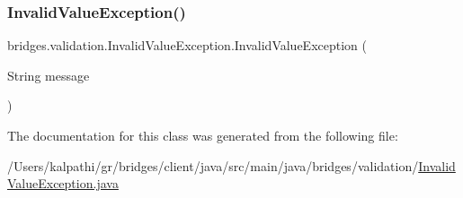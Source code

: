 \subsubsection{\texorpdfstring{Invalid\+Value\+Exception()}{InvalidValueException()}}
{\footnotesize\ttfamily bridges.\+validation.\+Invalid\+Value\+Exception.\+Invalid\+Value\+Exception (\begin{DoxyParamCaption}\item[{String}]{message }\end{DoxyParamCaption})}



The documentation for this class was generated from the following file\+:\begin{DoxyCompactItemize}
\item 
/\+Users/kalpathi/gr/bridges/client/java/src/main/java/bridges/validation/\mbox{\hyperlink{_invalid_value_exception_8java}{Invalid\+Value\+Exception.\+java}}\end{DoxyCompactItemize}
